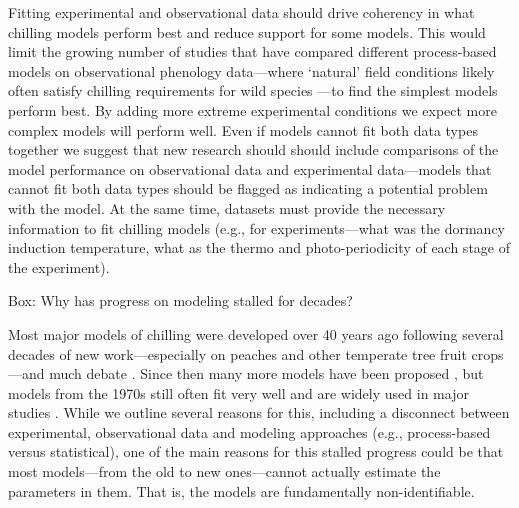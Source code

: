 \documentclass[11pt]{article}
\begin{document}
Fitting experimental and observational data should drive coherency in what chilling models perform best and reduce support for some models. This would limit the growing number of studies that have compared different process-based models on observational phenology data---where `natural' field conditions likely often satisfy chilling requirements for wild species \citep{basler2016evaluating,hufkens2018integrated}---to find the simplest models perform best. By adding more extreme experimental conditions we expect more complex models will perform well. Even if models cannot fit both data types together we suggest that new research should should include comparisons of the model performance on observational data and experimental data---models that cannot fit both data types should be flagged as indicating a potential problem with the model.  At the same time, datasets must provide the necessary information to fit chilling models (e.g., for experiments---what was the dormancy induction temperature, what as the thermo and photo-periodicity of each stage of the experiment). 




\vspace{10ex}
{\sc Box: Why has progress on modeling stalled for decades?} %

Most major models of chilling were developed over 40 years ago \citep{richardson1974,chuine2016} following several decades of new work---especially on peaches and other temperate tree fruit crops---and much debate \citep{dormtreeproc}. Since then many more models have been proposed \citep{luedeling2012chilling,chuine2016}, but models from the 1970s still often fit very well \citep{basler2016evaluating,chuine2016} and are widely used in major studies \citep[e.g.,][]{richardson1974,chuine2016,ospreebbms}. While we outline several reasons for this, including a disconnect between experimental, observational data and modeling approaches (e.g., process-based versus statistical), one of the main reasons for this stalled progress could be that most models---from the old to new ones---cannot actually estimate the parameters in them. That is, the models are fundamentally non-identifiable.
\end{document}
